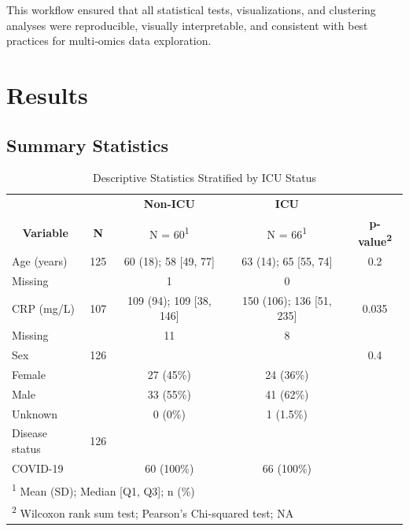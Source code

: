 \documentclass[a4paper,12pt]{article}
\begin{document}
This workflow ensured that all statistical tests, visualizations, and clustering analyses were reproducible, visually interpretable, and consistent with best practices for multi‑omics data exploration.

\section{Results}

\subsection{Summary Statistics}
\begin{table}[H]
    \centering
    \caption{Descriptive Statistics Stratified by ICU Status}
    \begin{tabular}{lcccc}
        \toprule
        \multicolumn{1}{c}{} & 
        \multicolumn{1}{c}{} & 
        \multicolumn{1}{c}{\textbf{Non-ICU}} & 
        \multicolumn{1}{c}{\textbf{ICU}} & 
        \multicolumn{1}{c}{} \\
        \multicolumn{1}{c}{\textbf{Variable}} & 
        \multicolumn{1}{c}{\textbf{N}} & 
        \multicolumn{1}{c}{N = 60\textsuperscript{1}} & 
        \multicolumn{1}{c}{N = 66\textsuperscript{1}} & 
        \multicolumn{1}{c}{\textbf{p-value\textsuperscript{2}}} \\
        \midrule
        Age (years) & 125 & 60 (18); 58 [49, 77] & 63 (14); 65 [55, 74] & 0.2 \\
        Missing & & 1 & 0 & \\
        CRP (mg/L) & 107 & 109 (94); 109 [38, 146] & 150 (106); 136 [51, 235] & 0.035 \\
        Missing & & 11 & 8 & \\
        Sex & 126 & & & 0.4 \\
        \quad Female & & 27 (45\%) & 24 (36\%) & \\
        \quad Male & & 33 (55\%) & 41 (62\%) & \\
        \quad Unknown & & 0 (0\%) & 1 (1.5\%) & \\
        Disease status & 126 & & & \\
        \quad COVID-19 & & 60 (100\%) & 66 (100\%) & \\
        \bottomrule
        \multicolumn{5}{l}{\footnotesize\textsuperscript{1} Mean (SD); Median [Q1, Q3]; n (\%)} \\
        \multicolumn{5}{l}{\footnotesize\textsuperscript{2} Wilcoxon rank sum test; Pearson's Chi-squared test; NA} \\
    \end{tabular}
    \label{tab:summary}
\end{table}
\end{document}
